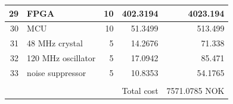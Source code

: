 \documentclass[../main/report.tex]{subfiles}
\begin{document}
\begin{table}[h]
\begin{tabular}{| r | l | r | r | r |}
    29 & FPGA & 10 & 402.3194 & 4023.194 \\\hline
    30 & MCU & 10 & 51.3499 & 513.499 \\\hline
    31 & 48 MHz crystal & 5 & 14.2676 & 71.338 \\\hline
    32 & 120 MHz oscillator & 5 & 17.0942 & 85.471 \\\hline
    33 & noise suppressor & 5 & 10.8353 & 54.1765 \\\hline
     & & & & \\\hline
     & & & Total cost & 7571.0785 NOK\\\hline
\end{tabular}
\label{fig: component_order}
\end{table}
\end{document}
